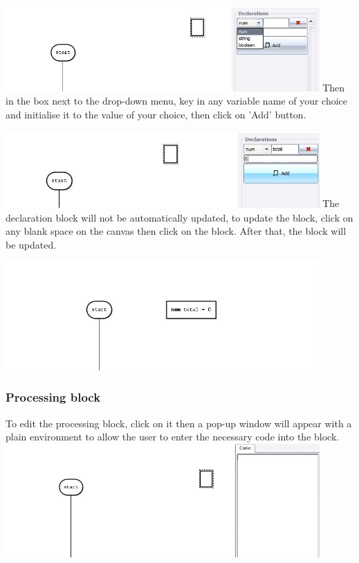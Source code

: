 \documentclass[11pt,a4paper,titlepage]{article}
\begin{document}
	\includegraphics[width=12cm]{images/editDeclaration1.jpg} \newline \newline
	Then in the box next to the drop-down menu, key in any variable name of your choice and initialise it to the value of your choice, then click on 'Add' button.\newline \newline
	
	\includegraphics[width=12cm]{images/editDeclaration2.jpg} \newline \newline
	The declaration block will not be automatically updated, to update the block, click on any blank space on the canvas then click on the block. After that, the block will be updated. \newline \newline
	
	\includegraphics[width=12cm]{images/editDeclaration3.jpg}
	
	
	\subsubsection{Processing block}
	
	To edit the processing block, click on it then a pop-up window will appear with a plain environment to allow the user to enter the necessary code into the block.\\ \newline
	\includegraphics[width=12cm]{images/editProcessing.jpg} \newline
	
\end{document}
